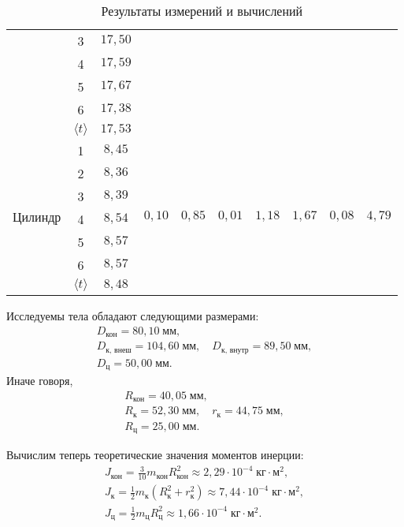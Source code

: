 \begin{table}
\begin{center}
\begin{tabular}{|c|c|c|c|c|c|c|c|c|c|}
		\cline{2-3}
		& 3 & $17{,}50$ & & & & & & & \\
		\cline{2-3}
		& 4 & $17{,}59$ & & & & & & & \\
		\cline{2-3}
		& 5 & $17{,}67$ & & & & & & & \\
		\cline{2-3}
		& 6 & $17{,}38$ & & & & & & & \\
		\cline{2-3}
		& $\langle t\rangle$ & $17{,}53$ & & & & & & & \\
		\hline
		\hline
		\multirow{7}{*}{\parbox[c]{4.1em}{Цилиндр}} & 1 & $8{,}45$ & \multirow{7}{*}{$0{,}10$} & \multirow{7}{*}{$0{,}85$} & \multirow{7}{*}{$0{,}01$} & \multirow{7}{*}{$1{,}18$} & \multirow{7}{*}{$1{,}67$} & \multirow{7}{*}{$0{,}08$} & \multirow{7}{*}{$4{,}79$} \\
		\cline{2-3}
		& 2 & $8{,}36$ & & & & & & & \\
		\cline{2-3}
		& 3 & $8{,}39$ & & & & & & & \\
		\cline{2-3}
		& 4 & $8{,}54$ & & & & & & & \\
		\cline{2-3}
		& 5 & $8{,}57$ & & & & & & & \\
		\cline{2-3}
		& 6 & $8{,}57$ & & & & & & & \\
		\cline{2-3}
		& $\langle t\rangle$ & $8{,}48$ & & & & & & & \\
		\hline
	\end{tabular}
	\caption{Результаты измерений и вычислений}\label{TbOne}
	\end{center}
\end{table}

Исследуемы тела обладают следующими размерами:
\begin{gather*}
D_\text{кон}=80{,}10\;\text{мм}, \\
D_\text{к, внеш}=104{,}60\;\text{мм},\quad D_\text{к, внутр}=89{,}50\;\text{мм}, \\
D_\text{ц}=50{,}00\;\text{мм}.
\end{gather*}
Иначе говоря,
\begin{gather*}
R_\text{кон}=40{,}05\;\text{мм}, \\
R_\text{к}=52{,}30\;\text{мм},\quad r_\text{к}=44{,}75\;\text{мм}, \\
R_\text{ц}=25{,}00\;\text{мм}.
\end{gather*}

Вычислим теперь теоретические значения моментов инерции:
\begin{gather*}
J_\text{кон}=\frac{3}{10}m_\text{кон}R_\text{кон}^2\approx2{,}29\cdot10^{-4}\;\text{кг$\cdot$м$^2$}, \\
J_\text{к}=\frac{1}{2}m_\text{к}\left(R_\text{к}^2+r_\text{к}^2\right)\approx7{,}44\cdot10^{-4}\;\text{кг$\cdot$м$^2$}, \\
J_\text{ц}=\frac{1}{2}m_\text{ц}R_\text{ц}^2\approx1{,}66\cdot10^{-4}\;\text{кг$\cdot$м$^2$}.
\end{gather*}

